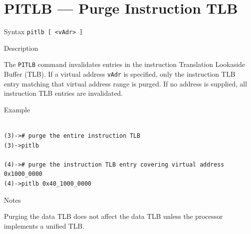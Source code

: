 %
%
\pagebreak
\section*{PITLB — Purge Instruction TLB}

\begin{iPageDescEntry}{Syntax}
\texttt{pitlb [ <vAdr> ]}
\end{iPageDescEntry}

\begin{iPageDescEntry}{Description}

The \texttt{PITLB} command invalidates entries in the instruction Translation
Lookaside Buffer (TLB). If a virtual address \texttt{vAdr} is specified, only the
instruction TLB entry matching that virtual address range is purged. If no
address is supplied, all instruction TLB entries are invalidated.

\end{iPageDescEntry}

\begin{iPageDescOpEntry}{Example}
\begin{lstlisting}[style=iPageOpStyle]

(3)-># purge the entire instruction TLB
(3)->pitlb

(4)-># purge the instruction TLB entry covering virtual address 0x1000_0000
(4)->pitlb 0x40_1000_0000

\end{lstlisting}
\end{iPageDescOpEntry}

\begin{iPageDescEntry}{Notes}

Purging the data TLB does not affect the data TLB unless the processor implements a unified TLB.

\end{iPageDescEntry}
